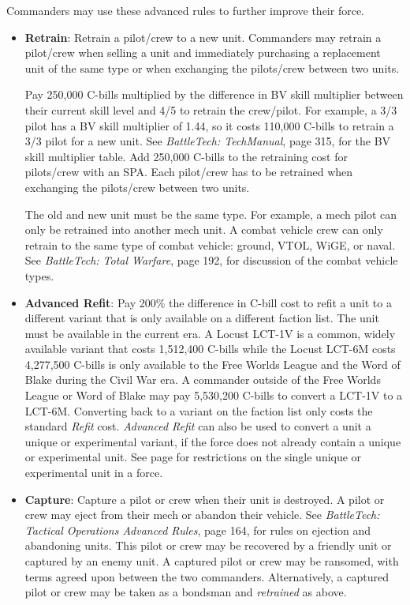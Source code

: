 \documentclass{article}
\begin{document}
Commanders may use these advanced rules to further improve their force.

\begin{itemize}

\item {\bfseries Retrain}: Retrain a pilot/crew to a new unit.
Commanders may retrain a pilot/crew when selling a unit and immediately purchasing a replacement unit of the same type or when exchanging the pilots/crew between two units.

Pay 250,000 C-bills multiplied by the difference in BV skill multiplier between their current skill level and 4/5 to retrain the crew/pilot.
For example, a 3/3 pilot has a BV skill multiplier of 1.44, so it costs 110,000 C-bills to retrain a 3/3 pilot for a new unit.
See \emph{BattleTech: TechManual}, page 315, for the BV skill multiplier table.
Add 250,000 C-bills to the retraining cost for pilots/crew with an SPA.
Each pilot/crew has to be retrained when exchanging the pilots/crew between two units.

The old and new unit must be the same type.
For example, a mech pilot can only be retrained into another mech unit.
A combat vehicle crew can only retrain to the same type of combat vehicle: ground, VTOL, WiGE, or naval.
See \emph{BattleTech: Total Warfare}, page 192, for discussion of the combat vehicle types.

\item {\bfseries Advanced Refit}: Pay 200\% the difference in C-bill cost to refit a unit to a different variant that is only available on a different faction list.
The unit must be available in the current era.
A Locust LCT-1V is a common, widely available variant that costs 1,512,400 C-bills while the Locust LCT-6M costs 4,277,500 C-bills is only available to the Free Worlds League and the Word of Blake during the Civil War era.
A commander outside of the Free Worlds League or Word of Blake may pay 5,530,200 C-bills to convert a LCT-1V to a LCT-6M.
Converting back to a variant on the faction list only costs the standard \emph{Refit} cost.
\emph{Advanced Refit} can also be used to convert a unit a unique or experimental variant, if the force does not already contain a unique or experimental unit.
See page \pageref{subsec:force_construction} for restrictions on the single unique or experimental unit in a force.

\item {\bfseries Capture}: Capture a pilot or crew when their unit is destroyed.
A pilot or crew may eject from their mech or abandon their vehicle.
See \emph{BattleTech: Tactical Operations Advanced Rules}, page 164, for rules on ejection and abandoning units.
This pilot or crew may be recovered by a friendly unit or captured by an enemy unit.
A captured pilot or crew may be ransomed, with terms agreed upon between the two commanders.
Alternatively, a captured pilot or crew may be taken as a bondsman and \emph{retrained} as above.


\end{itemize}
\end{document}
